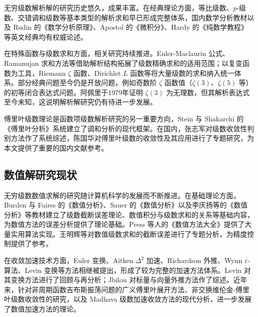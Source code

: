 无穷级数解析解的研究历史悠久，成果丰富。在经典理论方面，等比级数、$p$-级数、交错调和级数等基本类型的解析求和早已形成完整体系，国内数学分析教材以及 Rudin 的《数学分析原理》、Apostol 的《微积分》、Hardy 的《纯数学教程》等英文经典均有权威论述。

在特殊函数与级数求和方面，相关研究持续推进。Euler-Maclaurin 公式、Ramanujan 求和方法等借助解析结构拓展了级数精确求和的适用范围；以复变函数为工具，Riemann $\zeta$ 函数、Dirichlet $L$ 函数等将大量级数的求和纳入统一体系。部分经典问题至今仍是开放问题，例如奇数阶 $\zeta$ 函数值（$\zeta(3)$、$\zeta(5)$ 等）的初等闭合表达式问题。阿佩里于1979年证明 $\zeta(3)$ 为无理数，但其解析表达式至今未知，这说明解析解研究仍有待进一步发展。

傅里叶级数理论是函数项级数解析研究的另一重要方向，Stein 与 Shakarchi 的《傅里叶分析》系统建立了调和分析的现代框架。在国内，张志军对级数收敛性判别方法作了系统综述，陈国华对傅里叶级数的收敛性及其应用进行了专题研究，为本文提供了重要的国内文献参考。

\subsection{数值解研究现状}

无穷级数数值求解的研究随计算机科学的发展而不断推进。在基础理论方面，Burden 与 Faires 的《数值分析》、Sauer 的《数值分析》以及李庆扬等的《数值分析》等教材建立了级数截断误差理论、数值积分与级数求和的关系等基础内容，为数值方法的误差分析提供了理论基础。Press 等人的《数值方法大全》提供了大量实用算法实现。王明辉等对数值级数求和的截断误差进行了专题分析，为精度控制提供了参考。

在收敛加速技术方面，Euler 变换、Aitken $\Delta^2$ 加速、Richardson 外推、Wynn $\varepsilon$-算法、Levin 变换等方法相继被提出，形成了较为完整的加速方法体系。Levin 对其变换方法进行了回顾与再分析；Jbilou 对标量与向量外推方法作了综述。近年来，针对非周期函数吉布斯振荡问题的广义傅里叶展开方法、非交换维伦金-傅里叶级数收敛性的研究，以及 Madhava 级数加速收敛方法的现代分析，进一步发展了数值加速方法的理论。

